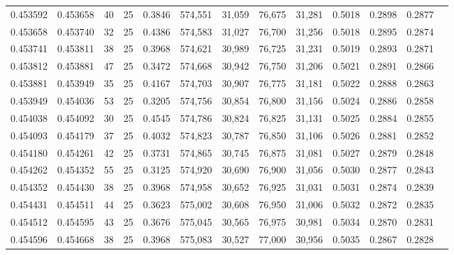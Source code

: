 \begin{tabular}{rrrrrrrrrrrrr}
0.453592 & 0.453658 &    40 &  25 &                                     0.3846 & 574,551 &  31,059 &  76,675 &  31,281 & 0.5018 & 0.2898 & 0.2877 \\
0.453658 & 0.453740 &    32 &  25 &                                     0.4386 & 574,583 &  31,027 &  76,700 &  31,256 & 0.5018 & 0.2895 & 0.2874 \\
0.453741 & 0.453811 &    38 &  25 &                                     0.3968 & 574,621 &  30,989 &  76,725 &  31,231 & 0.5019 & 0.2893 & 0.2871 \\
0.453812 & 0.453881 &    47 &  25 &                                     0.3472 & 574,668 &  30,942 &  76,750 &  31,206 & 0.5021 & 0.2891 & 0.2866 \\
0.453881 & 0.453949 &    35 &  25 &                                     0.4167 & 574,703 &  30,907 &  76,775 &  31,181 & 0.5022 & 0.2888 & 0.2863 \\
0.453949 & 0.454036 &    53 &  25 &                                     0.3205 & 574,756 &  30,854 &  76,800 &  31,156 & 0.5024 & 0.2886 & 0.2858 \\
0.454038 & 0.454092 &    30 &  25 &                                     0.4545 & 574,786 &  30,824 &  76,825 &  31,131 & 0.5025 & 0.2884 & 0.2855 \\
0.454093 & 0.454179 &    37 &  25 &                                     0.4032 & 574,823 &  30,787 &  76,850 &  31,106 & 0.5026 & 0.2881 & 0.2852 \\
0.454180 & 0.454261 &    42 &  25 &                                     0.3731 & 574,865 &  30,745 &  76,875 &  31,081 & 0.5027 & 0.2879 & 0.2848 \\
0.454262 & 0.454352 &    55 &  25 &                                     0.3125 & 574,920 &  30,690 &  76,900 &  31,056 & 0.5030 & 0.2877 & 0.2843 \\
0.454352 & 0.454430 &    38 &  25 &                                     0.3968 & 574,958 &  30,652 &  76,925 &  31,031 & 0.5031 & 0.2874 & 0.2839 \\
0.454431 & 0.454511 &    44 &  25 &                                     0.3623 & 575,002 &  30,608 &  76,950 &  31,006 & 0.5032 & 0.2872 & 0.2835 \\
0.454512 & 0.454595 &    43 &  25 &                                     0.3676 & 575,045 &  30,565 &  76,975 &  30,981 & 0.5034 & 0.2870 & 0.2831 \\
0.454596 & 0.454668 &    38 &  25 &                                     0.3968 & 575,083 &  30,527 &  77,000 &  30,956 & 0.5035 & 0.2867 & 0.2828 \\

\end{tabular}
